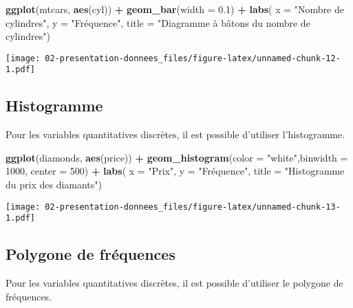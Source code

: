 \documentclass[]{book}
\newenvironment{Shaded}{\begin{snugshade}}{\end{snugshade}}
\newcommand{\KeywordTok}[1]{\textcolor[rgb]{0.13,0.29,0.53}{\textbf{#1}}}
\newcommand{\DataTypeTok}[1]{\textcolor[rgb]{0.13,0.29,0.53}{#1}}
\newcommand{\DecValTok}[1]{\textcolor[rgb]{0.00,0.00,0.81}{#1}}
\newcommand{\FloatTok}[1]{\textcolor[rgb]{0.00,0.00,0.81}{#1}}
\newcommand{\StringTok}[1]{\textcolor[rgb]{0.31,0.60,0.02}{#1}}
\newcommand{\OperatorTok}[1]{\textcolor[rgb]{0.81,0.36,0.00}{\textbf{#1}}}
\newcommand{\NormalTok}[1]{#1}
\begin{document}
\begin{Shaded}
\begin{Highlighting}[]
\KeywordTok{ggplot}\NormalTok{(mtcars, }\KeywordTok{aes}\NormalTok{(cyl)) }\OperatorTok{+}\StringTok{ }
\StringTok{  }\KeywordTok{geom_bar}\NormalTok{(}\DataTypeTok{width =} \FloatTok{0.1}\NormalTok{) }\OperatorTok{+}\StringTok{ }
\StringTok{  }\KeywordTok{labs}\NormalTok{(}
    \DataTypeTok{x =} \StringTok{"Nombre de cylindres"}\NormalTok{, }
    \DataTypeTok{y =} \StringTok{"Fréquence"}\NormalTok{, }
    \DataTypeTok{title =} \StringTok{"Diagramme à bâtons du nombre de cylindres"}\NormalTok{)}
\end{Highlighting}
\end{Shaded}

\texttt{[image: 02-presentation-donnees\_files/figure-latex/unnamed-chunk-12-1.pdf]}

\subsection{Histogramme}\label{histogramme}

Pour les variables quantitatives discrètes, il est possible d'utiliser
l'histogramme.

\begin{Shaded}
\begin{Highlighting}[]
\KeywordTok{ggplot}\NormalTok{(diamonds, }\KeywordTok{aes}\NormalTok{(price)) }\OperatorTok{+}\StringTok{ }
\StringTok{  }\KeywordTok{geom_histogram}\NormalTok{(}\DataTypeTok{color =} \StringTok{"white"}\NormalTok{,}\DataTypeTok{binwidth =} \DecValTok{1000}\NormalTok{, }\DataTypeTok{center =} \DecValTok{500}\NormalTok{) }\OperatorTok{+}
\StringTok{  }\KeywordTok{labs}\NormalTok{(}
    \DataTypeTok{x =} \StringTok{"Prix"}\NormalTok{, }
    \DataTypeTok{y =} \StringTok{"Fréquence"}\NormalTok{, }
    \DataTypeTok{title =} \StringTok{"Histogramme du prix des diamants"}\NormalTok{)}
\end{Highlighting}
\end{Shaded}

\texttt{[image: 02-presentation-donnees\_files/figure-latex/unnamed-chunk-13-1.pdf]}

\subsection{Polygone de fréquences}\label{polygone-de-frequences}

Pour les variables quantitatives discrètes, il est possible d'utiliser
le polygone de fréquences.
\end{document}
